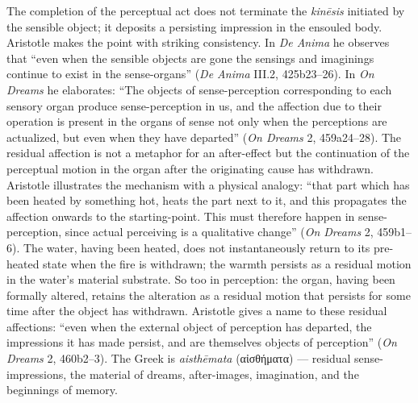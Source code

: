 \documentclass{article}
\newcommand{\gk}[1]{{\greekfont #1}}
\begin{document}
The completion of the perceptual act does not terminate the \textit{kinēsis} initiated by the sensible object; it deposits a persisting impression in the ensouled body. Aristotle makes the point with striking consistency. In \textit{De Anima} he observes that ``even when the sensible objects are gone the sensings and imaginings continue to exist in the sense-organs'' (\textit{De Anima} III.2, 425b23--26). In \textit{On Dreams} he elaborates: ``The objects of sense-perception corresponding to each sensory organ produce sense-perception in us, and the affection due to their operation is present in the organs of sense not only when the perceptions are actualized, but even when they have departed'' (\textit{On Dreams} 2, 459a24--28). The residual affection is not a metaphor for an after-effect but the continuation of the perceptual motion in the organ after the originating cause has withdrawn. Aristotle illustrates the mechanism with a physical analogy: ``that part which has been heated by something hot, heats the part next to it, and this propagates the affection onwards to the starting-point. This must therefore happen in sense-perception, since actual perceiving is a qualitative change'' (\textit{On Dreams} 2, 459b1--6). The water, having been heated, does not instantaneously return to its pre-heated state when the fire is withdrawn; the warmth persists as a residual motion in the water's material substrate. So too in perception: the organ, having been formally altered, retains the alteration as a residual motion that persists for some time after the object has withdrawn. Aristotle gives a name to these residual affections: ``even when the external object of perception has departed, the impressions it has made persist, and are themselves objects of perception'' (\textit{On Dreams} 2, 460b2--3). The Greek is \textit{aisthēmata} (\gk{αἰσθήματα}) --- residual sense-impressions, the material of dreams, after-images, imagination, and the beginnings of memory.
\end{document}
